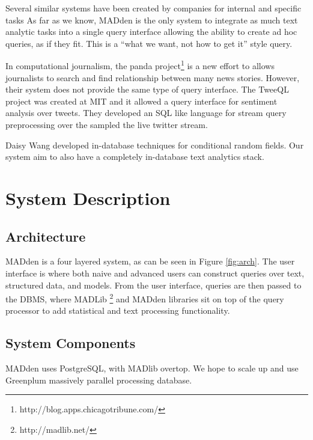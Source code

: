 \documentclass[11pt,onecolumn]{article}
\newcommand{\system}{MADden\xspace}
\begin{document}
Several similar systems have been created by companies for 
internal and specific tasks
As far as we know, \system is the only system to integrate as much text analytic
tasks into a single query interface allowing the ability to 
create ad hoc queries, as if they fit.
  This is a ``what we want, not how to get it'' style query.

In computational journalism, the panda project\footnote{http://blog.apps.chicagotribune.com/}  
is a new effort to allows journalists to search and find relationship between 
many news stories. However, their system does not provide the same type of 
query interface.
The TweeQL project was created at MIT and it allowed a query interface for 
sentiment analysis over tweets\cite{Marcus:2011:TDD:1989323.1989470}. 
They developed an SQL like language for stream query preprocessing over the 
sampled the live twitter stream.

Daisy Wang \cite{wang2011hybrid} developed in-database techniques for 
conditional random fields. Our system aim to also have a completely in-database
text analytics stack.


  \section{System Description }
  \subsection{Architecture}

  {\system} is a four layered system, as can be seen in Figure \ref{fig:arch}.
  The user interface is where both naive and advanced users can construct queries over text, structured data, and models.
  From the user interface,
  queries are then passed to the DBMS,
  where MADLib \footnote{http://madlib.net/} and {\system} libraries sit on top of the query processor to add statistical and text processing functionality.


  \subsection{System Components}

  \system uses PostgreSQL, with MADlib overtop.
  We hope to scale up and use Greenplum massively parallel processing database.
\end{document}
